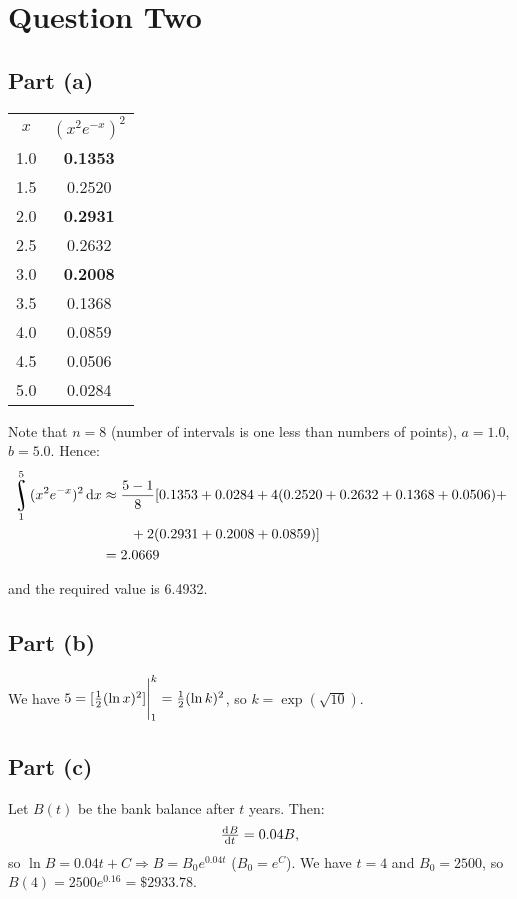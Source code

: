 \documentclass[a4paper]{report}
\DeclareMathOperator*{\rint}{\scalerel*{\rotatebox{17}{$\!\int\!$}}{\int}}
\begin{document}
\section*{Question Two}
\subsection*{Part (a)}
\begin{center}
  \def\arraystretch{1.5}%
  \begin{tabular}{|c|c|}          \hline
    $ x $ & \mathstrut$ (x^2 e^{-x})^2 $\\\hhline{|=|=|}
    1.0   & \textbf{0.1353}   \\\hline
    1.5   & 0.2520            \\\hline
    2.0   & \textbf{0.2931}   \\\hline
    2.5   & 0.2632            \\\hline
    3.0   & \textbf{0.2008}   \\\hline
    3.5   & 0.1368            \\\hline
    4.0   & 0.0859            \\\hline
    4.5   & 0.0506            \\\hline
    5.0   & 0.0284            \\\hline
  \end{tabular}
\end{center}

Note that $ n = 8 $ (number of intervals is one less than numbers of points), $ a = 1.0 $, $ b = 5.0 $. Hence:
\begin{align*}
  \rint^{5}_1 (x^2 e^{-x})^2 \dif{x} &\approx \frac{5 - 1}{8} [0.1353 + 0.0284 + 4(0.2520 + 0.2632 + 0.1368 + 0.0506) +\\
                                     &\qquad+ 2(0.2931 + 0.2008 + 0.0859)]\\
                                     &=2.0669
\end{align*}

and the required value is 6.4932.

\subsection*{Part (b)}
We have $ 5 = \eval{[\frac{1}{2}(\ln x)^2]}_1^k = \frac{1}{2} (\ln k)^2 $, so $ k = \exp(\sqrt{10}) $.

\subsection*{Part (c)}
Let $ B(t) $ be the bank balance after $ t $ years. Then:
\begin{displaymath}
  \od{B}{t} = 0.04B,
\end{displaymath}
so $ \ln B = 0.04t + C \Rightarrow B = B_0 e^{0.04t} $ ($ B_0 = e^C $). We have $ t = 4 $ and $ B_0 = 2500 $,
so $ B(4) = 2500 e^{0.16} = \$2933.78 $.
\end{document}
